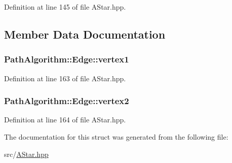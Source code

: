Definition at line 145 of file A\+Star.\+hpp.



\subsection{Member Data Documentation}
\subsubsection[{\texorpdfstring{vertex1}{vertex1}}]{ Path\+Algorithm\+::\+Edge\+::vertex1}\hypertarget{struct_path_algorithm_1_1_edge_ab655d5ef6c7022bc87520c4e751b4dcf}{}\label{struct_path_algorithm_1_1_edge_ab655d5ef6c7022bc87520c4e751b4dcf}


Definition at line 163 of file A\+Star.\+hpp.

\subsubsection[{\texorpdfstring{vertex2}{vertex2}}]{ Path\+Algorithm\+::\+Edge\+::vertex2}\hypertarget{struct_path_algorithm_1_1_edge_ab8d28fabc8b10986f4e4d915f0b6f16a}{}\label{struct_path_algorithm_1_1_edge_ab8d28fabc8b10986f4e4d915f0b6f16a}


Definition at line 164 of file A\+Star.\+hpp.



The documentation for this struct was generated from the following file\+:\begin{DoxyCompactItemize}
\item 
src/\hyperlink{_a_star_8hpp}{A\+Star.\+hpp}\end{DoxyCompactItemize}
